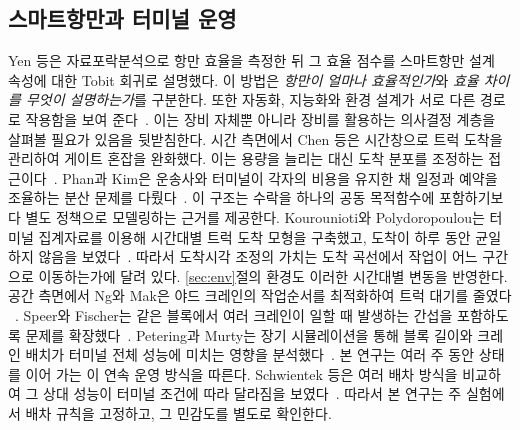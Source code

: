 \documentclass{llncs}
\begin{document}
\subsection{스마트항만과 터미널 운영}
\label{sec:rel-port}
Yen 등은 자료포락분석으로 항만 효율을 측정한 뒤 그 효율 점수를 스마트항만 설계
속성에 대한 Tobit 회귀로 설명했다. 이 방법은 \emph{항만이 얼마나 효율적인가}와
\emph{효율 차이를 무엇이 설명하는가}를 구분한다. 또한 자동화, 지능화와 환경 설계가
서로 다른 경로로 작용함을 보여 준다~\cite{ref1}. 이는 장비 자체뿐 아니라 장비를
활용하는 의사결정 계층을 살펴볼 필요가 있음을 뒷받침한다.
시간 측면에서 Chen 등은 시간창으로 트럭 도착을 관리하여 게이트 혼잡을 완화했다. 이는
용량을 늘리는 대신 도착 분포를 조정하는 접근이다~\cite{ref4}. Phan과 Kim은 운송사와
터미널이 각자의 비용을 유지한 채 일정과 예약을 조율하는 분산 문제를 다뤘다~\cite{ref6}.
이 구조는 수락을 하나의 공동 목적함수에 포함하기보다 별도 정책으로 모델링하는 근거를
제공한다. Kourounioti와 Polydoropoulou는 터미널 집계자료를 이용해 시간대별 트럭 도착
모형을 구축했고, 도착이 하루 동안 균일하지 않음을 보였다~\cite{ref13}. 따라서 도착시각
조정의 가치는 도착 곡선에서 작업이 어느 구간으로 이동하는가에 달려 있다.
\ref{sec:env}절의 환경도 이러한 시간대별 변동을 반영한다.
공간 측면에서 Ng와 Mak은 야드 크레인의 작업순서를 최적화하여 트럭 대기를 줄였다
~\cite{ref7}. Speer와 Fischer는 같은 블록에서 여러 크레인이 일할 때 발생하는 간섭을
포함하도록 문제를 확장했다~\cite{ref8}. Petering과 Murty는 장기 시뮬레이션을 통해 블록
길이와 크레인 배치가 터미널 전체 성능에 미치는 영향을 분석했다~\cite{ref9}. 본 연구는
여러 주 동안 상태를 이어 가는 이 연속 운영 방식을 따른다. Schwientek 등은 여러 배차
방식을 비교하여 그 상대 성능이 터미널 조건에 따라 달라짐을 보였다~\cite{ref16}.
따라서 본 연구는 주 실험에서 배차 규칙을 고정하고, 그 민감도를 별도로 확인한다.
\end{document}
